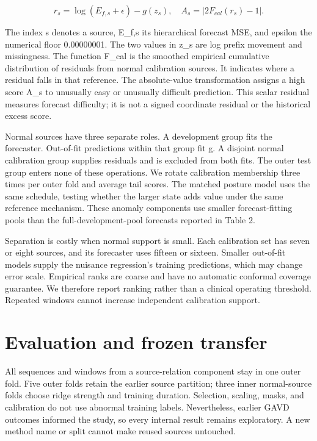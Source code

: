 \documentclass[letterpaper]{article}
\begin{document}
\begin{equation}r_s=\log(E_{f,s}+\epsilon)-g(z_s),\quad A_s=|2F_{cal}(r_s)-1|.\end{equation}

The index s denotes a source, E\_f,s its hierarchical forecast MSE, and epsilon the numerical floor 0.00000001. The two values in z\_s are log prefix movement and missingness. The function F\_cal is the smoothed empirical cumulative distribution of residuals from normal calibration sources. It indicates where a residual falls in that reference. The absolute-value transformation assigns a high score A\_s to unusually easy or unusually difficult prediction. This scalar residual measures forecast difficulty; it is not a signed coordinate residual or the historical excess score.

Normal sources have three separate roles. A development group fits the forecaster. Out-of-fit predictions within that group fit g. A disjoint normal calibration group supplies residuals and is excluded from both fits. The outer test group enters none of these operations. We rotate calibration membership three times per outer fold and average tail scores. The matched posture model uses the same schedule, testing whether the larger state adds value under the same reference mechanism. These anomaly components use smaller forecast-fitting pools than the full-development-pool forecasts reported in Table 2.

Separation is costly when normal support is small. Each calibration set has seven or eight sources, and its forecaster uses fifteen or sixteen. Smaller out-of-fit models supply the nuisance regression's training predictions, which may change error scale. Empirical ranks are coarse and have no automatic conformal coverage guarantee. We therefore report ranking rather than a clinical operating threshold. Repeated windows cannot increase independent calibration support.

\section{Evaluation and frozen transfer}

All sequences and windows from a source-relation component stay in one outer fold. Five outer folds retain the earlier source partition; three inner normal-source folds choose ridge strength and training duration. Selection, scaling, masks, and calibration do not use abnormal training labels. Nevertheless, earlier GAVD outcomes informed the study, so every internal result remains exploratory. A new method name or split cannot make reused sources untouched.
\end{document}

